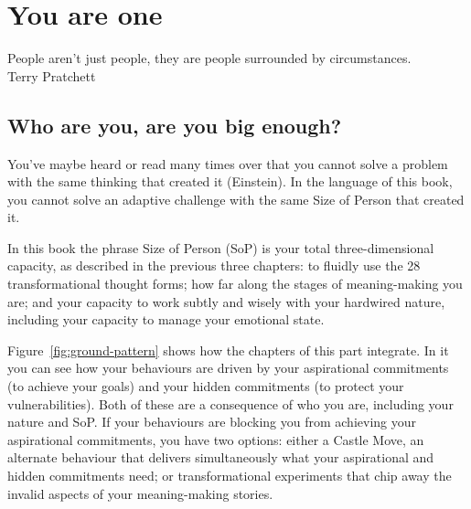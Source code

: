 \chapter{You are one}
\label{chapter:who-am-i-one}


\begin{chapterquotation}
People aren't just people, they are people surrounded by circumstances.\\
\raggedleft\textemdash Terry Pratchett 
\end{chapterquotation}


\section{Who are you, are you big enough?}
\label{section:size-of-person}
You’ve maybe heard or read many times over that you cannot solve a problem with the same thinking that created it (Einstein).  In the language of this book, you cannot solve an adaptive challenge with the same Size of Person  that created it.


In this book the phrase Size of Person (SoP) is your total three-dimensional capacity, as described in the previous three chapters: to fluidly use the 28 transformational thought forms; how far along the stages of meaning\hyp{}making you are; and your capacity to work subtly and wisely with your hardwired nature, including your capacity to manage your emotional state.


Figure~\ref{fig:ground-pattern} shows how the chapters of this part integrate. In it you can see how your behaviours are driven by your aspirational commitments (to achieve your goals) and your hidden commitments (to protect your vulnerabilities). Both of these are a consequence of who you are, including your nature and SoP. If your behaviours are blocking you from achieving your aspirational commitments, you have two options: either a Castle Move, an alternate behaviour that delivers simultaneously what your aspirational and hidden commitments need; or transformational experiments that chip away the invalid aspects of your meaning\hyp{}making stories.


